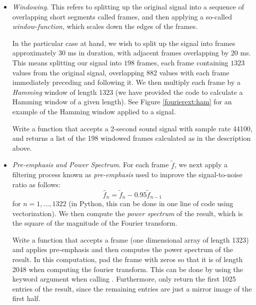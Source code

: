 \begin{itemize}
\item \emph{Windowing}. This refers to splitting up the original signal into a sequence of overlapping
short segments called frames, and then applying a so-called \emph{window-function}, which scales down
the edges of the frames.

In the particular case at hand, we wish to split up the signal into frames approximately 30 ms in
duration, with adjacent frames overlapping by 20 ms. This means splitting our signal into $198$ frames, each frame containing $1323$ values from the original signal, overlapping $882$ values with each frame immediately preceding and following it. We then multiply each frame by a \emph{Hamming} window of length
1323 (we have provided the code to calculate a Hamming window of a given length). See Figure \ref{fourierext:ham} for an example of the Hamming window applied to a signal.

\begin{problem}
Write a function  that accepts a 2-second sound signal with sample rate 44100, and
returns a list of the 198 windowed frames calculated as in the description above.
\end{problem}

\item \emph{Pre-emphasis and Power Spectrum}. For each frame $\tilde{f}$, we next apply
a filtering process known as \emph{pre-emphasis} used to improve the signal-to-noise ratio as follows:
\begin{equation*}
\widehat{f}_{n} = \tilde{f}_{n} - 0.95 \tilde{f}_{n-1}
\end{equation*}
for $n = 1,\ldots,1322$ (in Python, this can be done in one line of code using vectorization).
We then compute the \emph{power spectrum} of the result, which is the square of the magnitude of the
Fourier transform.

\begin{problem}
Write a function  that accepts a frame (one dimensional array of length 1323) and
applies pre-emphasis and then computes the power spectrum of the result. In this computation,
pad the frame with zeros so that it is of length 2048 when computing the fourier transform. This
can be done by using the keyword argument  when calling
. Furthermore, only return the first 1025 entries of the result,
since the remaining entries are just a mirror image of the first half.
\end{problem}


\end{itemize}
